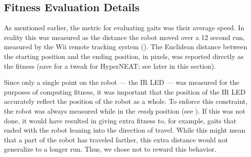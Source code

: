 \subsection{Fitness Evaluation Details}

%
%
%
%
%
%

As mentioned earlier, the metric for evaluating gaits was their
average speed.  In reality this was measured as the distance the robot
moved over a 12 second run, measured by the Wii remote tracking system
().  The Euclidean distance between the
starting position and the ending position, in pixels, was reported
directly as the fitness (save for a tweak for HyperNEAT; see later in
this section).

Since only a single point on the robot --- the IR LED --- was measured
for the purposes of computing fitness, it was important that the
position of the IR LED accurately reflect the position of the robot as
a whole.  To enforce this constraint, the robot was always measured
while in the \emph{ready} position (see ).  If
this was not done, it would have resulted in giving extra fitness to,
for example, gaits that ended with the robot leaning into the
direction of travel.  While this might mean that a part of the robot
has traveled farther, this extra distance would not generalize to a
longer run.  Thus, we chose not to reward this behavior.

